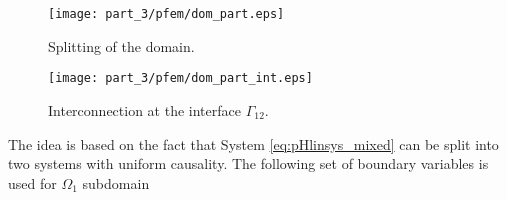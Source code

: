\begin{figure}[t]
	\begin{minipage}[b]{0.4\linewidth}
		\centering
		\texttt{[image: part\_3/pfem/dom\_part.eps]}
		\caption{Splitting of the domain.}
		\label{fig:dom_part}
	\end{minipage}
	\hspace{0.5cm}
	\begin{minipage}[b]{0.55\linewidth}
		\centering
			\texttt{[image: part\_3/pfem/dom\_part\_int.eps]}
		\caption{Interconnection at the interface $\Gamma_{12}$.}
		\label{fig:dom_part_int}
	\end{minipage}
\end{figure}


The idea is based on the fact that System \ref{eq:pHlinsys_mixed} can be split into two systems with uniform causality.  The following set of boundary variables is used for $\Omega_1$ subdomain

